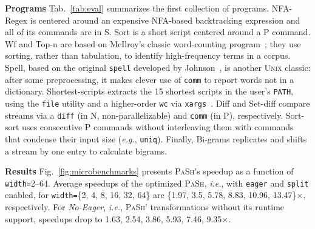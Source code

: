 \documentclass[sigplan, review, screen, anonymous]{acmart}
\newcommand{\eg}{{\em e.g.}, }
\newcommand{\ie}{{\em i.e.}, }
\newcommand{\heading}[1]{\vspace{4pt}\noindent\textbf{#1}\enspace}
\newcommand{\ttt}[1]{\texttt{#1}}
\newcommand{\cn}[1]{\mbox{\textcircled{\footnotesize #1}}}
\newcommand{\sta}{\cn{\textsc{S}}\xspace}
\newcommand{\pur}{\cn{\textsc{P}}\xspace}
\newcommand{\npu}{\cn{\textsc{N}}\xspace}
\newcommand{\nv}[1]{[{\color{cyan}nv: #1}]}
\newcommand{\kk}[1]{[{\color{magenta}kk: #1}]}
\newcommand{\tr}[1]{} %
\newcommand{\sys}{{\scshape PaSh}\xspace}
\newcommand{\unix}{{\scshape Unix}\xspace}
\begin{document}
\heading{Programs}
Tab.~\ref{tab:eval} summarizes the first collection of programs.
NFA-Regex is centered around an expensive NFA-based backtracking expression and all of its commands are in \sta.
Sort is a short script centered around a \pur command.
Wf and Top-n are based on McIlroy's classic word-counting program~\cite{bentley1986literate};
  they use sorting, rather than tabulation, to identify high-frequency terms in a corpus.
Spell, based on the original \ttt{spell} developed by Johnson~\cite{bentley1985spelling}, is another \unix classic:
  after some preprocessing, it makes clever use of \ttt{comm} to report words not in a dictionary.
Shortest-scripts extracts the 15 shortest scripts in the user's \ttt{PATH}, using the \ttt{file} utility and a higher-order \ttt{wc} via \ttt{xargs}~\cite[pg. 7]{taylor2004wicked}.
Diff and Set-diff compare streams via a \ttt{diff} (in \npu, non-parallelizable) and \ttt{comm} (in \pur), respectively.
Sort-sort uses consecutive \pur commands without interleaving them with commands that condense their input size (\eg \ttt{uniq}).
Finally, Bi-grams replicates and shifts a stream by one entry to calculate bigrams.

\heading{Results}
Fig.~\ref{fig:microbenchmarks} presents \sys's speedup as a function of \ttt{width=}2--64.
Average speedups of the optimized \sys, \ie with \ttt{eager} and \ttt{split} enabled, for \ttt{width=}\{2, 4, 8, 16, 32, 64\} are \{1.97, 3.5, 5.78, 8.83, 10.96, 13.47\}$\times$, respectively.
For \emph{No-Eager}, \ie \sys' transformations without its runtime support, speedups drop to 1.63, 2.54, 3.86, 5.93, 7.46, 9.35$\times$.
\end{document}
